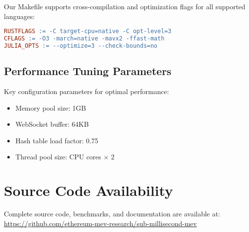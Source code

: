 \documentclass[12pt]{article}
\begin{document}
Our Makefile supports cross-compilation and optimization flags for all supported languages:

\begin{lstlisting}[language=make]
RUSTFLAGS := -C target-cpu=native -C opt-level=3
CFLAGS := -O3 -march=native -mavx2 -ffast-math
JULIA_OPTS := --optimize=3 --check-bounds=no
\end{lstlisting}

\subsection{Performance Tuning Parameters}

Key configuration parameters for optimal performance:

\begin{itemize}
    \item Memory pool size: 1GB
    \item WebSocket buffer: 64KB
    \item Hash table load factor: 0.75
    \item Thread pool size: CPU cores × 2
\end{itemize}

\section{Source Code Availability}

Complete source code, benchmarks, and documentation are available at:
\url{https://github.com/ethereum-mev-research/sub-millisecond-mev}
\end{document}
